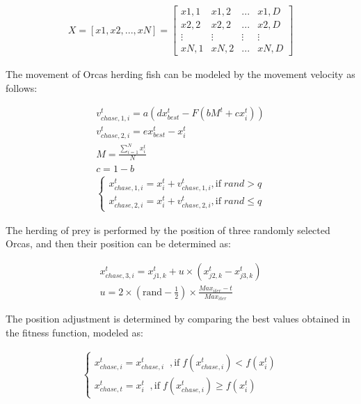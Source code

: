 \documentclass{elsarticle}
\begin{document}
\begin{equation}
\begin{gathered}
X = [ x1, x2, ..., xN ] =\begin{bmatrix}
  x1,1 & x1,2 & ... & x1,D  \\
  x2,2 & x2,2 & ... & x2,D  \\
  \vdots & \vdots & \vdots & \vdots \\
  xN,1 & xN,2 & ... & xN,D
\end{bmatrix}
\end{gathered}
\label{eq18}
\end{equation}

The movement of Orcas herding fish can be modeled by the movement velocity as follows:

\begin{equation}
\begin{gathered}
v_{chase,1,i}^t = a ( d x_{best}^t - F (b M^t + c x_i^t)) \\
v_{chase,2,i}^t = e x_{best}^t - x_{i}^t \\
M = \frac{\sum_{i=1}^{N} x_i^t}{N} \\
c=1-b \\
\begin{cases}
  x_{chase,1,i}^t = x_{i}^t + v_{chase,1,i}^t , \text{if} \;rand > q \\
  x_{chase,2,i}^t = x_{i}^t + v_{chase,2,i}^t  , \text{if} \;rand \leq q
\end{cases}
\end{gathered}
\label{eq19}
\end{equation}

The herding of prey is performed by the position of three randomly selected Orcas, and then their position can be determined as:

\begin{equation}
\begin{gathered}
x_{chase,3,i}^t =x_{j1,k}^t +u \times (x_{j2,k}^t - x_{j3,k}^t ) \\
u = 2 \times (\text{rand} - \frac{1}{2}) \times \frac{Max_{iter}-t}{Max_{iter}}
\end{gathered}
\label{eq20}
\end{equation}

The position adjustment is determined by comparing the best values obtained in the fitness function, modeled as:

\begin{equation}
\begin{gathered}
\begin{cases}
  x_{chase,i}^t = x_{chase,i}^t \;\;, \text{if} \; f(x_{chase,i}^t) < f(x_{i}^t ) \\
  x_{chase,t}^t = x_{i}^t  \;\;, \text{if} \;f(x_{chase,i}^t) \geq f(x_{i}^t )
\end{cases}
\end{gathered}
\label{eq21}
\end{equation}
\end{document}

